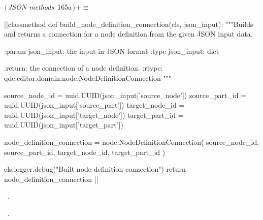 \documentclass[%
    a4paper,    %
    justified,  %
    nobib,      %
    openany     %
]{tufte-book}
\begin{document}
\begin{flushleft} \small
\begin{minipage}{\linewidth}\label{scrap197}\raggedright\small
{} $\langle\,${\itshape JSON methods}\nobreak\ {\footnotesize {165a}}$\,\rangle+\equiv$
\vspace{-1ex}
\begin{pythoncode}
|\normalfont{}\fontfamily{}|classmethod
def build_node_definition_connection(cls, json_input):
    """Builds and returns a connection for a node definition from the given
    JSON input data.

    :param json_input: the input in JSON format
    :type  json_input: dict

    :return: the connection of a node definition.
    :rtype:  qde.editor.domain.node.NodeDefinitionConnection
    """

    source_node_id = uuid.UUID(json_input['source_node'])
    source_part_id = uuid.UUID(json_input['source_part'])
    target_node_id = uuid.UUID(json_input['target_node'])
    target_part_id = uuid.UUID(json_input['target_part'])

    node_definition_connection = node.NodeDefinitionConnection(
        source_node_id,
        source_part_id,
        target_node_id,
        target_part_id
    )

    cls.logger.debug("Built node definition connection")
    return node_definition_connection
|\NWsep|
\end{pythoncode}
\vspace{1.5ex}
\footnotesize
\begin{list}{}{\setlength{\itemsep}{-\parsep}\setlength{\itemindent}{-\leftmargin}}
\item \NWtxtMacroDefBy\ .
\item \NWtxtMacroRefIn\ .

\item{}
\end{list}
\end{minipage}\vspace{4ex}
\end{flushleft}
\end{document}

